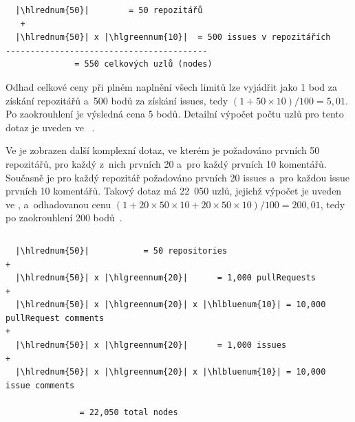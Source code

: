 \begin{listing}[H]
  \renewcommand{\fcolorbox}[4][]{#4} %
  \inputminted[linenos,escapeinside=||]{graphql}{code/gh_correct_graphql.gql}
  \caption{Ukázka korektního GraphQL dotazu.}
  \label{lst:graphql_query}
\end{listing}

\begin{listing}[H]
\begin{verbatim}
  |\hlrednum{50}|        = 50 repozitářů
   +
  |\hlrednum{50}| x |\hlgreennum{10}|  = 500 issues v repozitářích
-----------------------------------------
              = 550 celkových uzlů (nodes)
\end{verbatim}
  \caption{Výpočet celkového limitu dotazu (Node limit)}
  \label{lst:graphql_calc}
\end{listing}


Odhad celkové ceny při plném naplnění všech limitů lze vyjádřit jako 1 bod za získání repozitářů a~500 bodů za získání issues, tedy $(1 + 50 \times 10) / 100 = 5{,}01$. Po zaokrouhlení je výsledná cena 5 bodů. Detailní výpočet počtu uzlů pro tento dotaz je uveden ve ~\cite{github_graphql_rate_limits}.

Ve  je zobrazen další komplexní dotaz, ve kterém je požadováno prvních 50 repozitářů, pro každý z~nich prvních 20 \PR a~pro každý \PR prvních 10 komentářů. Současně je pro každý repozitář požadováno prvních 20 issues a~pro každou issue prvních 10 komentářů. Takový dotaz má 22~050 uzlů, jejichž výpočet je uveden ve , a~odhadovanou cenu $(1 + 20 \times 50 \times 10 + 20 \times 50 \times 10) / 100 = 200{,}01$, tedy po zaokrouhlení 200 bodů~\cite{github_graphql_rate_limits}.

\begin{listing}[H]
  \renewcommand{\fcolorbox}[4][]{#4} %
  \inputminted[linenos,escapeinside=||]{graphql}{code/gh_complex_query.gql}
  \caption{Ukázka komplexního GraphQL dotazu}
  \label{lst:graphql_complex_query}
\end{listing}

\begin{listing}[H]
\begin{verbatim}
  |\hlrednum{50}|           = 50 repositories
+
  |\hlrednum{50}| x |\hlgreennum{20}|      = 1,000 pullRequests
+
  |\hlrednum{50}| x |\hlgreennum{20}| x |\hlbluenum{10}| = 10,000 pullRequest comments
+
  |\hlrednum{50}| x |\hlgreennum{20}|      = 1,000 issues
+
  |\hlrednum{50}| x |\hlgreennum{20}| x |\hlbluenum{10}| = 10,000 issue comments

               = 22,050 total nodes
\end{verbatim}
  \caption{Výpočet celkového limitu komplexního dotazu (Node limit)}
  \label{lst:graphql_complex_calc}
\end{listing}
